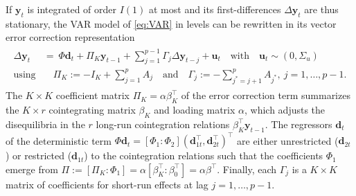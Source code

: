 If $ \boldsymbol{y}_{t} $ is integrated of order $ I(1) $ at most and its first-differences $ \Delta \boldsymbol{y}_{t} $ are thus stationary, the VAR model of \eqref{eq:VAR} in levels can be rewritten in its vector error correction representation
\begin{align} \label{eq:VECM}
\begin{split}
	\Delta \boldsymbol{y}_{t} \ & = \ \Phi \boldsymbol{d}_{t} + \Pi_{K} \boldsymbol{y}_{t-1} + \sum_{j=1}^{p-1} \Gamma_{j} \Delta \boldsymbol{y}_{t-j} + \boldsymbol{u}_{t} \quad \textrm{with} \quad \boldsymbol{u}_{t} \sim (0,\Sigma_u)
	\\ \textrm{using} & \quad \Pi_{K} := -I_K+\sum_{j=1}^{p} A_j \quad \textrm{and} \quad \Gamma_j := -\sum_{j^*=j+1}^{p} A_{j^*}, \ j=1,\ldots,p-1.
\end{split}
\end{align}
The $ K \times K $ coefficient matrix $ \Pi_{K} = \alpha\beta_{K}^\top $ of the error correction term summarizes the \mbox{$ K \times r $} cointegrating matrix $ \beta_{K} $ and loading matrix $ \alpha $, which adjusts the disequilibria in the $ r $ long-run cointegration relations $ \beta_{K}^\top \boldsymbol{y}_{t-1} $. The regressors $ \boldsymbol{d}_{t} $ of the deterministic term $ \Phi \boldsymbol{d}_t = \left[ \Phi_1 : \Phi_{2} \right] \left( \boldsymbol{d}_{1t}^\top, \boldsymbol{d}_{2t}^\top \right)^\top $ are either unrestricted ($ \boldsymbol{d}_{2t} $) or restricted ($ \boldsymbol{d}_{1t} $) to the cointegration relations such that the coefficients $ \Phi_1 $ emerge from $ \Pi := \left[ \Pi_{K} : \Phi_1 \right] = \alpha \left[ \beta_{K}^\top : \beta_0^\top \right] = \alpha \beta^\top $. Finally, each $ \Gamma_{j} $ is a $ K \times K $ matrix of coefficients for short-run effects at lag $ j=1,\ldots,p-1 $.


